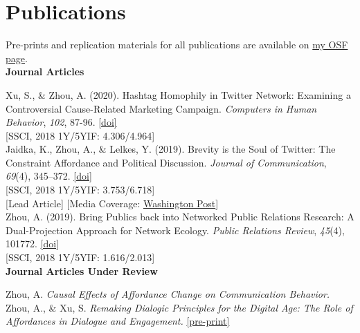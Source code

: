 \documentclass[12pt, letterpaper]{article}
\newcommand{\doi}[1]{\href{#1}{{[doi]}}}
\newcommand{\preprint}[1]{\href{#1}{{[pre-print]}}}
\newcommand{\years}[1]{\marginnote{\normalsize #1}}
\begin{document}
\section*{Publications}
\vspace{-12pt}
{\footnotesize \text{*} Pre-prints and replication materials for all publications are available on \href{https://osf.io/utdaf/}{my OSF page}.}\\

\textbf{Journal Articles}

  \years{[3]} Xu, S., \& Zhou, A. (2020). Hashtag Homophily in Twitter Network: Examining a Controversial Cause-Related Marketing Campaign. \textit{Computers in Human Behavior}, \textit{102}, 87-96. \doi{https://doi.org/10.1016/j.chb.2019.08.006}\\
  \years{} {[SSCI, 2018 1Y/5YIF: 4.306/4.964]}\\
  \years{[2]} Jaidka, K., Zhou, A., \& Lelkes, Y. (2019). Brevity is the Soul of Twitter: The Constraint Affordance and Political Discussion. \textit{Journal of Communication}, \textit{69}(4), 345–372. \doi{https://doi.org/10.1093/joc/jqz023}\\
  \years{} {[SSCI, 2018 1Y/5YIF: 3.753/6.718]}\\
  \years{} {[Lead Article] [Media Coverage: \href{https://www.washingtonpost.com/politics/2019/09/17/twitter-got-somewhat-more-civil-when-tweets-doubled-length-heres-how-we-know}{Washington Post}]}\\
  \years{[1]} Zhou, A. (2019). Bring Publics back into Networked Public Relations Research: A Dual-Projection Approach for Network Ecology. \textit{Public Relations Review}, \textit{45}(4), 101772. \doi{https://doi.org/10.1016/j.pubrev.2019.03.004}\\
  \years{} {[SSCI, 2018 1Y/5YIF: 1.616/2.013]}\\

\textbf{Journal Articles Under Review}

\years{[2]} Zhou, A. \textit{Causal Effects of Affordance Change on Communication Behavior.}\\
\years{[1]} Zhou, A., \& Xu, S. \textit{Remaking Dialogic Principles for the Digital Age: The Role of Affordances in Dialogue and Engagement.} \preprint{https://dx.doi.org/10.31235/osf.io/uzhk9}\\
\end{document}

